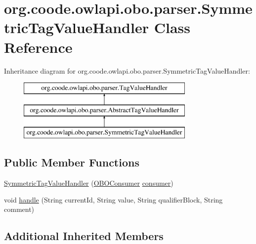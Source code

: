 \hypertarget{classorg_1_1coode_1_1owlapi_1_1obo_1_1parser_1_1_symmetric_tag_value_handler}{\section{org.\-coode.\-owlapi.\-obo.\-parser.\-Symmetric\-Tag\-Value\-Handler Class Reference}
\label{classorg_1_1coode_1_1owlapi_1_1obo_1_1parser_1_1_symmetric_tag_value_handler}
}
Inheritance diagram for org.\-coode.\-owlapi.\-obo.\-parser.\-Symmetric\-Tag\-Value\-Handler\-:\begin{figure}[H]
\begin{center}
\leavevmode
\includegraphics[height=3.000000cm]{classorg_1_1coode_1_1owlapi_1_1obo_1_1parser_1_1_symmetric_tag_value_handler}
\end{center}
\end{figure}
\subsection*{Public Member Functions}
\begin{DoxyCompactItemize}
\item 
\hyperlink{classorg_1_1coode_1_1owlapi_1_1obo_1_1parser_1_1_symmetric_tag_value_handler_ab902ec56abf7304d6b2c2d9e675dde2a}{Symmetric\-Tag\-Value\-Handler} (\hyperlink{classorg_1_1coode_1_1owlapi_1_1obo_1_1parser_1_1_o_b_o_consumer}{O\-B\-O\-Consumer} \hyperlink{classorg_1_1coode_1_1owlapi_1_1obo_1_1parser_1_1_abstract_tag_value_handler_ab27f1ff22d15640c5f81585f18265137}{consumer})
\item 
void \hyperlink{classorg_1_1coode_1_1owlapi_1_1obo_1_1parser_1_1_symmetric_tag_value_handler_a1ece03d5ac2c402ef7a279d34e593338}{handle} (String current\-Id, String value, String qualifier\-Block, String comment)
\end{DoxyCompactItemize}
\subsection*{Additional Inherited Members}


